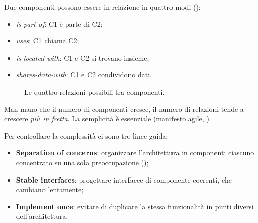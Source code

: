 Due componenti possono essere in relazione in quattro modi ():
\begin{itemize}
  \item \emph{is-part-of}: C1 è parte di C2;
  \item \emph{uses}: C1 chiama C2;
  \item \emph{is-located-with}: C1 e C2 si trovano insieme;
  \item \emph{shares-data-with}: C1 e C2 condividono dati.
\end{itemize}

\begin{figure}[ht]
\centering
{}
\caption{Le quattro relazioni possibili tra componenti.}
\label{fig:arch-relazioni}
\end{figure}

\begin{attenzione}[Complessità]
Man mano che il numero di componenti cresce, il numero di relazioni tende a crescere \emph{più in fretta}. La
semplicità è essenziale (manifesto agile, ).
\end{attenzione}

Per controllare la complessità ci sono tre linee guida:
\begin{itemize}
  \item \textbf{Separation of concerns}: organizzare l'architettura in componenti ciascuno concentrato su una sola
    preoccupazione ();
  \item \textbf{Stable interfaces}: progettare interfacce di componente coerenti, che cambiano lentamente;
  \item \textbf{Implement once}: evitare di duplicare la stessa funzionalità in punti diversi dell'architettura.
\end{itemize}

